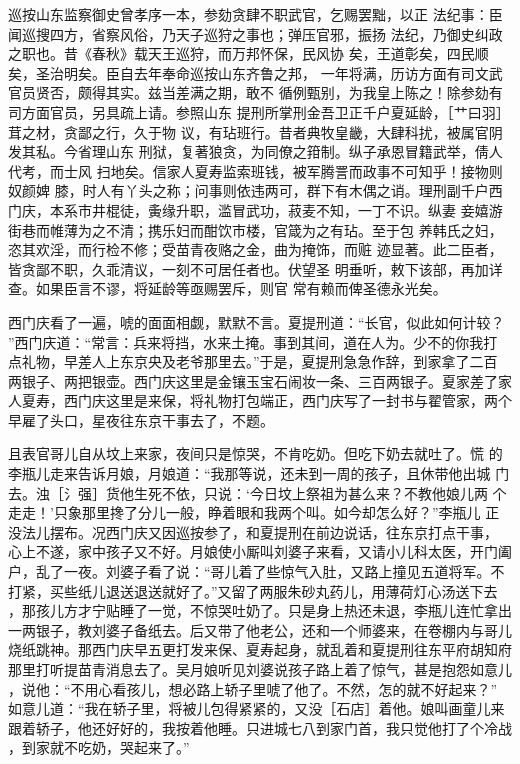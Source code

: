 巡按山东监察御史曾孝序一本，参劾贪肆不职武官，乞赐罢黜，以正
法纪事：臣闻巡搜四方，省察风俗，乃天子巡狩之事也；弹压官邪，振扬
法纪，乃御史纠政之职也。昔《春秋》载天王巡狩，而万邦怀保，民风协
矣，王道彰矣，四民顺矣，圣治明矣。臣自去年奉命巡按山东齐鲁之邦，
一年将满，历访方面有司文武官员贤否，颇得其实。兹当差满之期，敢不
循例甄别，为我皇上陈之！除参劾有司方面官员，另具疏上请。参照山东
提刑所掌刑金吾卫正千户夏延龄，［艹曰羽］茸之材，贪鄙之行，久于物
议，有玷班行。昔者典牧皇畿，大肆科扰，被属官阴发其私。今省理山东
刑狱，复著狼贪，为同僚之箝制。纵子承恩冒籍武举，倩人代考，而士风
扫地矣。信家人夏寿监索班钱，被军腾詈而政事不可知乎！接物则奴颜婢
膝，时人有丫头之称；问事则依违两可，群下有木偶之诮。理刑副千户西
门庆，本系市井棍徒，夤缘升职，滥冒武功，菽麦不知，一丁不识。纵妻
妾嬉游街巷而帷薄为之不清；携乐妇而酣饮市楼，官箴为之有玷。至于包
养韩氏之妇，恣其欢淫，而行检不修；受苗青夜赂之金，曲为掩饰，而赃
迹显著。此二臣者，皆贪鄙不职，久乖清议，一刻不可居任者也。伏望圣
明垂听，敕下该部，再加详查。如果臣言不谬，将延龄等亟赐罢斥，则官
常有赖而俾圣德永光矣。

西门庆看了一遍，唬的面面相觑，默默不言。夏提刑道：“长官，似此如何计较？
”西门庆道：“常言：兵来将挡，水来土掩。事到其间，道在人为。少不的你我打
点礼物，早差人上东京央及老爷那里去。”于是，夏提刑急急作辞，到家拿了二百
两银子、两把银壶。西门庆这里是金镶玉宝石闹妆一条、三百两银子。夏家差了家
人夏寿，西门庆这里是来保，将礼物打包端正，西门庆写了一封书与翟管家，两个
早雇了头口，星夜往东京干事去了，不题。

且表官哥儿自从坟上来家，夜间只是惊哭，不肯吃奶。但吃下奶去就吐了。慌
的李瓶儿走来告诉月娘，月娘道：“我那等说，还未到一周的孩子，且休带他出城
门去。浊［氵强］货他生死不依，只说：‘今日坟上祭祖为甚么来？不教他娘儿两
个走走！’只象那里搀了分儿一般，睁着眼和我两个叫。如今却怎么好？”李瓶儿
正没法儿摆布。况西门庆又因巡按参了，和夏提刑在前边说话，往东京打点干事，
心上不遂，家中孩子又不好。月娘使小厮叫刘婆子来看，又请小儿科太医，开门阖
户，乱了一夜。刘婆子看了说：“哥儿着了些惊气入肚，又路上撞见五道将军。不
打紧，买些纸儿退送退送就好了。”又留了两服朱砂丸药儿，用薄荷灯心汤送下去
，那孩儿方才宁贴睡了一觉，不惊哭吐奶了。只是身上热还未退，李瓶儿连忙拿出
一两银子，教刘婆子备纸去。后又带了他老公，还和一个师婆来，在卷棚内与哥儿
烧纸跳神。那西门庆早五更打发来保、夏寿起身，就乱着和夏提刑往东平府胡知府
那里打听提苗青消息去了。吴月娘听见刘婆说孩子路上着了惊气，甚是抱怨如意儿
，说他：“不用心看孩儿，想必路上轿子里唬了他了。不然，怎的就不好起来？”
如意儿道：“我在轿子里，将被儿包得紧紧的，又没［石店］着他。娘叫画童儿来
跟着轿子，他还好好的，我按着他睡。只进城七八到家门首，我只觉他打了个冷战
，到家就不吃奶，哭起来了。”

